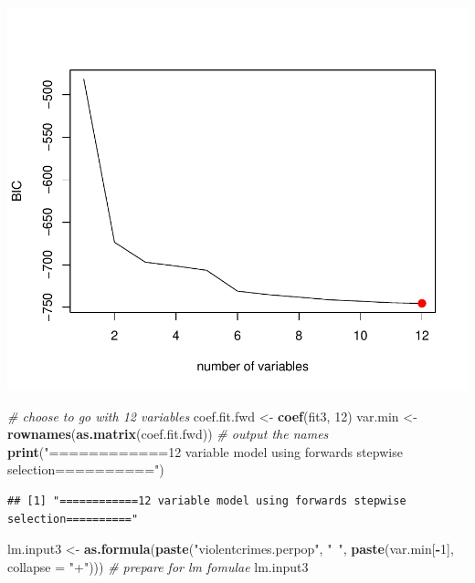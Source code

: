 \documentclass[]{article}
\newenvironment{Shaded}{\begin{snugshade}}{\end{snugshade}}
\newcommand{\KeywordTok}[1]{\textcolor[rgb]{0.13,0.29,0.53}{\textbf{#1}}}
\newcommand{\DataTypeTok}[1]{\textcolor[rgb]{0.13,0.29,0.53}{#1}}
\newcommand{\DecValTok}[1]{\textcolor[rgb]{0.00,0.00,0.81}{#1}}
\newcommand{\StringTok}[1]{\textcolor[rgb]{0.31,0.60,0.02}{#1}}
\newcommand{\CommentTok}[1]{\textcolor[rgb]{0.56,0.35,0.01}{\textit{#1}}}
\newcommand{\OperatorTok}[1]{\textcolor[rgb]{0.81,0.36,0.00}{\textbf{#1}}}
\newcommand{\NormalTok}[1]{#1}
\begin{document}
\begin{flushleft}\includegraphics{Midterm_11_01_2016_Answers_files/figure-latex/unnamed-chunk-25-3} \end{flushleft}

\begin{Shaded}
\begin{Highlighting}[]
\CommentTok{# choose to go with 12 variables}
\NormalTok{coef.fit.fwd <-}\StringTok{ }\KeywordTok{coef}\NormalTok{(fit3, }\DecValTok{12}\NormalTok{)}
\NormalTok{var.min <-}\StringTok{ }\KeywordTok{rownames}\NormalTok{(}\KeywordTok{as.matrix}\NormalTok{(coef.fit.fwd))  }\CommentTok{# output the names}
\KeywordTok{print}\NormalTok{(}\StringTok{"============12 variable model using forwards stepwise selection=========="}\NormalTok{)}
\end{Highlighting}
\end{Shaded}

\begin{verbatim}
## [1] "============12 variable model using forwards stepwise selection=========="
\end{verbatim}

\begin{Shaded}
\begin{Highlighting}[]
\NormalTok{lm.input3 <-}\StringTok{ }\KeywordTok{as.formula}\NormalTok{(}\KeywordTok{paste}\NormalTok{(}\StringTok{"violentcrimes.perpop"}\NormalTok{, }\StringTok{"~"}\NormalTok{, }\KeywordTok{paste}\NormalTok{(var.min[}\OperatorTok{-}\DecValTok{1}\NormalTok{], }
    \DataTypeTok{collapse =} \StringTok{"+"}\NormalTok{)))  }\CommentTok{# prepare for lm fomulae}
\NormalTok{lm.input3}
\end{Highlighting}
\end{Shaded}
\end{document}
